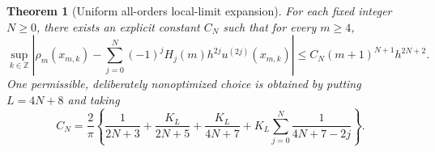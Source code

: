 \documentclass[11pt,a4paper]{article}
\numberwithin{equation}{section}
\newtheorem{theorem}{Theorem}[section]
\theoremstyle{definition}
\newcommand{\Z}{\mathbb Z}
\begin{document}
\begin{theorem}[Uniform all-orders local-limit expansion]\label{thm:local-limit}
For each fixed integer $N\geq0$, there exists an explicit constant
$C_N$ such that for every $m\geq4$,
\begin{equation}
 \boxed{
 \sup_{k\in\Z}\left|
 \rho_m(x_{m,k})-
 \sum_{j=0}^N(-1)^jH_j(m)h^{2j}u^{(2j)}(x_{m,k})
 \right|
 \leq C_N(m+1)^{N+1}h^{2N+2}.}
 \label{eq:uniform-local-limit}
\end{equation}
One permissible, deliberately nonoptimized choice is obtained by
putting $L=4N+8$ and taking
\begin{equation}
 C_N=\frac2\pi\left\{
 \frac1{2N+3}+\frac{K_L}{2N+5}
 +\frac{K_L}{4N+7}
 +K_L\sum_{j=0}^N\frac1{4N+7-2j}
 \right\}.
 \label{eq:CN-explicit}
\end{equation}
\end{theorem}
\end{document}
